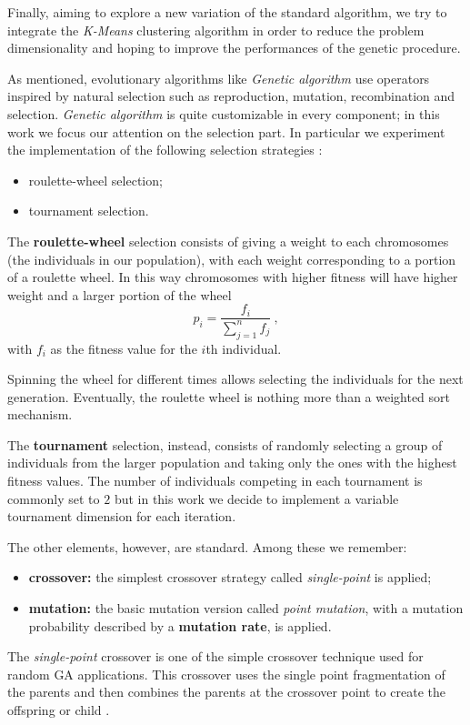 \documentclass[10pt]{article}
\begin{document}
Finally, aiming to explore a new variation of the standard algorithm, we try to integrate the \textit{K-Means} clustering algorithm in order to reduce the problem dimensionality and hoping to improve the performances of the  genetic procedure.

As mentioned, evolutionary algorithms like \textit{Genetic algorithm} use operators inspired by natural selection such as reproduction, mutation, recombination and selection.
\textit{Genetic algorithm} is quite customizable in every component; in this work we focus our attention on the selection part.
In particular we experiment the implementation of the following selection strategies \cite{ventuno}:
\begin{itemize}
\item roulette-wheel selection;
\item tournament selection.
\end{itemize}
The \textbf{roulette-wheel} selection consists of giving a weight to each chromosomes (the individuals in our population), with each weight corresponding to a portion of a roulette wheel.
In this way chromosomes with higher fitness will have higher weight and a larger portion of the wheel
\begin{equation}
p_i = \frac{f_i}{\sum_{j = 1}^n f_j} ~,
\end{equation}
with $f_i$ as the fitness value for the $i$th individual.

Spinning the wheel for different times allows selecting the individuals for the next generation.
Eventually, the roulette wheel is nothing more than a weighted sort mechanism.

The \textbf{tournament} selection, instead, consists of randomly selecting a group of individuals from the larger population and taking only the ones with the highest fitness values. 
The number of individuals competing in each tournament is commonly set to $2$ but in this work we decide to implement a variable tournament dimension for each iteration.

The other elements, however, are standard.
Among these we remember:
\begin{itemize}
\item \textbf{crossover:} the simplest crossover strategy called \textit{single-point} is applied;
\item \textbf{mutation:} the basic mutation version called \textit{point mutation}, with a mutation probability described by a \textbf{mutation rate}, is applied.
\end{itemize}
The \textit{single-point} crossover is one of the simple crossover technique used for random GA applications. This crossover uses the single point fragmentation of the parents and then combines the parents at the crossover point to create the offspring or child \cite{venticinque}.
\end{document}
